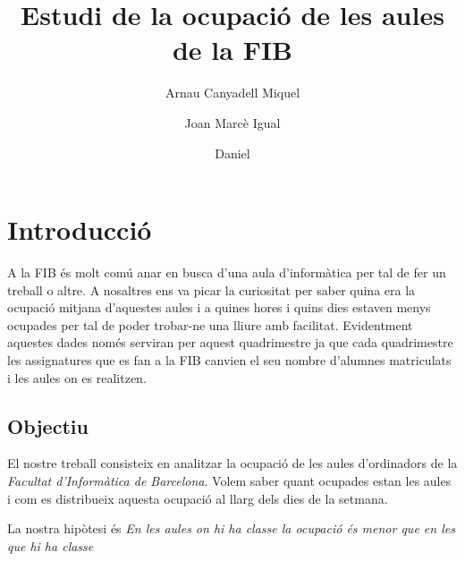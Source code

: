 \documentclass[a4paper, 12pt]{article}
\begin{document}
\title{Estudi de la ocupació de les aules de la FIB}
\author{Arnau Canyadell Miquel \and Joan Marcè Igual \and Daniel}

\maketitle
\newpage
\tableofcontents

\newpage
\section{Introducció}

A la FIB és molt comú anar en busca d'una aula d'informàtica per tal de fer un treball o altre. A nosaltres ens va picar la curiositat per saber quina era la ocupació mitjana d'aquestes aules i a quines hores i quins dies estaven menys ocupades per tal de poder trobar-ne una lliure amb facilitat. Evidentment aquestes dades només serviran per aquest quadrimestre ja que cada quadrimestre les assignatures que es fan a la FIB canvien el seu nombre d'alumnes matriculats i les aules on es realitzen.

\subsection{Objectiu}

El nostre treball consisteix en analitzar la ocupació de les aules d'ordinadors de la \emph{Facultat d'Informàtica de Barcelona}. Volem saber quant ocupades estan les aules i com es distribueix aquesta ocupació al llarg dels dies de la setmana.

La nostra hipòtesi és \emph{En les aules on hi ha classe la ocupació és menor que en les que hi ha classe}


\end{document}
